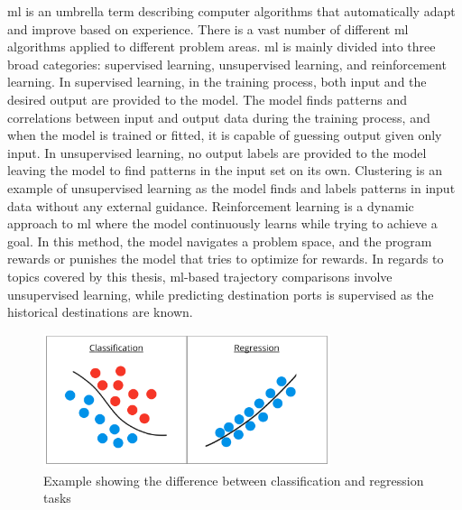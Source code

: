 \acrfull{ml} is an umbrella term describing computer algorithms that automatically adapt and improve based on experience. There is a vast number of different \acrshort{ml} algorithms applied to different problem areas. \acrshort{ml} is mainly divided into three broad categories: supervised learning, unsupervised learning, and reinforcement learning. In supervised learning, in the training process, both input and the desired output are provided to the model. The model finds patterns and correlations between input and output data during the training process, and when the model is trained or fitted, it is capable of guessing output given only input. In unsupervised learning, no output labels are provided to the model leaving the model to find patterns in the input set on its own. Clustering is an example of unsupervised learning as the model finds and labels patterns in input data without any external guidance. Reinforcement learning is a dynamic approach to \acrshort{ml} where the model continuously learns while trying to achieve a goal. In this method, the model navigates a problem space, and the program rewards or punishes the model that tries to optimize for rewards. In regards to topics covered by this thesis, \acrshort{ml}-based trajectory comparisons involve unsupervised learning, while predicting destination ports is supervised as the historical destinations are known.

\begin{figure}[htbp]  %
    \centering
    \includegraphics[width=0.75\textwidth]{figures/class_regg}
    \caption{Example showing the difference between classification and regression tasks}
    \label{fig:classification_regression}
\end{figure}

